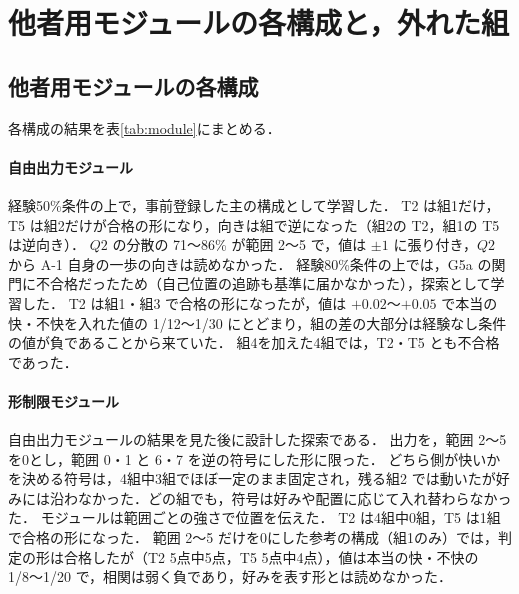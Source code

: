\section{他者用モジュールの各構成と，外れた組}\label{app:component}

\subsection{他者用モジュールの各構成}
各構成の結果を表\ref{tab:module}にまとめる．

\begin{table}[t]
  \centering
  \small
  \caption{他者用モジュールの各構成の結果}
  \label{tab:module}
  
\end{table}

\paragraph{自由出力モジュール}
経験50\%条件の上で，事前登録した主の構成として学習した．
T2 は組1だけ，T5 は組2だけが合格の形になり，向きは組で逆になった（組2の T2，組1の T5 は逆向き）．
$Q2$ の分散の 71〜86\% が範囲 2〜5 で，値は $\pm1$ に張り付き，$Q2$ から A-1 自身の一歩の向きは読めなかった．
経験80\%条件の上では，G5a の関門に不合格だったため（自己位置の追跡も基準に届かなかった），探索として学習した．
T2 は組1・組3 で合格の形になったが，値は $+0.02$〜$+0.05$ で本当の快・不快を入れた値の 1/12〜1/30 にとどまり，組の差の大部分は経験なし条件の値が負であることから来ていた．
組4を加えた4組では，T2・T5 とも不合格であった．

\paragraph{形制限モジュール}
自由出力モジュールの結果を見た後に設計した探索である．
出力を，範囲 2〜5 を0とし，範囲 0・1 と 6・7 を逆の符号にした形に限った．
どちら側が快いかを決める符号は，4組中3組でほぼ一定のまま固定され，残る組2 では動いたが好みには沿わなかった．どの組でも，符号は好みや配置に応じて入れ替わらなかった．
モジュールは範囲ごとの強さで位置を伝えた．
T2 は4組中0組，T5 は1組で合格の形になった．
範囲 2〜5 だけを0にした参考の構成（組1のみ）では，判定の形は合格したが（T2 5点中5点，T5 5点中4点），値は本当の快・不快の 1/8〜1/20 で，相関は弱く負であり，好みを表す形とは読めなかった．

